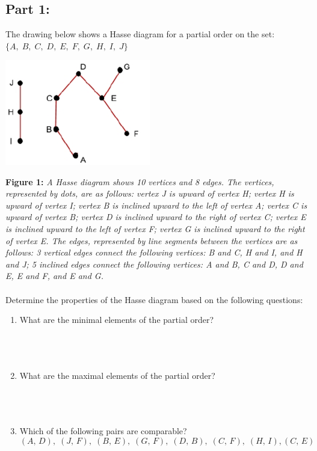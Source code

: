 \documentclass{amsart}
\theoremstyle{definition}
\theoremstyle{Exercise}
\theoremstyle{remark}
\theoremstyle{rule}
\numberwithin{equation}{section}
\begin{document}
 \subsection*{Part 1:}
 The drawing below shows a Hasse diagram for a partial order on the set:
 \\
   $\{A, \;B,\; C,\; D,\; E,\; F,\; G,\; H,\; I, \; J\}$
 \begin{center}
 \includegraphics[width=2.5in]{NewHasse}
 \end{center}
 {\color{blue} {\bf Figure 1:} \emph{A Hasse diagram shows 10 vertices and 8 edges. The vertices, represented by dots, are as follows:  vertex J is upward of vertex H; vertex H is upward of vertex I; vertex B is inclined upward to the left of vertex A; vertex C is upward of vertex B; vertex D is inclined upward to the right of vertex C; vertex E is inclined upward to the left of vertex F; vertex G is inclined upward to the right of vertex E. The edges, represented by line segments between the vertices are as follows: 3 vertical edges connect the following vertices: B and C, H and I, and H and J; 5 inclined edges connect the following vertices: A and B, C and D, D and E, E and F, and E and G. 
  }
  }
  \\\\
 Determine the properties of the Hasse diagram based on the following questions:

  \begin{enumerate}[label=(\alph*)]
    \item What are the minimal elements of the partial order?
\\\\
\\\\
    \item What are the maximal elements of the partial order?
\\\\
\\\\
    \item Which of the following pairs are comparable?
\[(A,\, D),\; (J,\, F),\; (B,\, E),\; (G,\, F),\; (D,\, B),\; (C,\, F),\; (H,\, I), (C,\, E)\]
\\\\
\\\\
   \end{enumerate}
   \newpage
~\\
\end{document}
